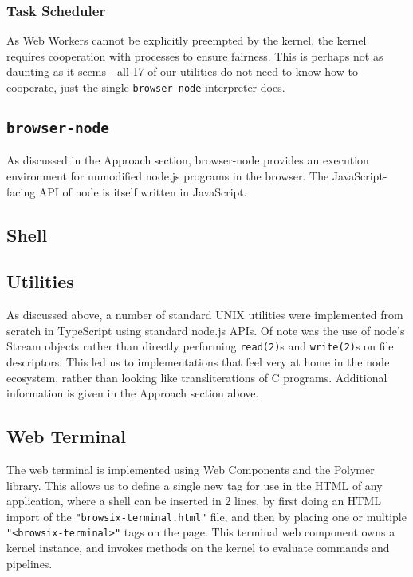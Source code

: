 \documentclass{acm_proc_article-sp}
\begin{document}
\subsubsection{Task Scheduler}

As Web Workers cannot be explicitly preempted by the kernel, the
kernel requires cooperation with processes to ensure fairness.  This
is perhaps not as daunting as it seems - all 17 of our utilities do
not need to know how to cooperate, just the single
\texttt{browser-node} interpreter does.

\subsection{\texttt{browser-node}}

As discussed in the Approach section, browser-node provides an
execution environment for unmodified node.js programs in the browser.
The JavaScript-facing API of node is itself written in JavaScript.

\subsection{Shell}

\subsection{Utilities}

As discussed above, a number of standard UNIX utilities were
implemented from scratch in TypeScript using standard node.js APIs.
Of note was the use of node's Stream objects rather than directly
performing \texttt{read(2)}s and \texttt{write(2)}s on file
descriptors.  This led us to implementations that feel very at home in
the node ecosystem, rather than looking like transliterations of C
programs.  Additional information is given in the Approach section
above.

\subsection{Web Terminal}

The web terminal is implemented using Web Components and the Polymer
library.  This allows us to define a single new tag for use in the
HTML of any application, where a shell can be inserted in 2 lines, by
first doing an HTML import of the \texttt{"browsix-terminal.html"}
file, and then by placing one or multiple
\texttt{"<browsix-terminal>"} tags on the page.  This terminal web
component owns a kernel instance, and invokes methods on the kernel to
evaluate commands and pipelines.
\end{document}
